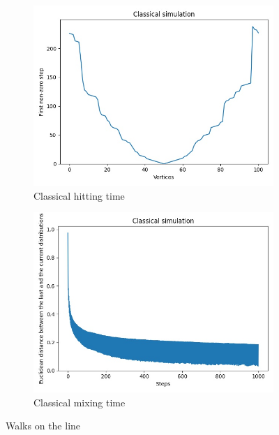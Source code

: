 \begin{figure}[H]
  \centering
  \begin{subfigure}{.45\linewidth}
    \centering
    \includegraphics[width=\linewidth]{./figures/results/path/classical_hitting_time.jpg}
    \caption{Classical hitting time}
  \end{subfigure}
  \begin{subfigure}{.45\linewidth}
    \centering
    \includegraphics[width=\linewidth]{./figures/results/path/classical_mixing_time.jpg}
    \caption{Classical mixing time}
  \end{subfigure}
  \caption{Walks on the line}
\end{figure}

